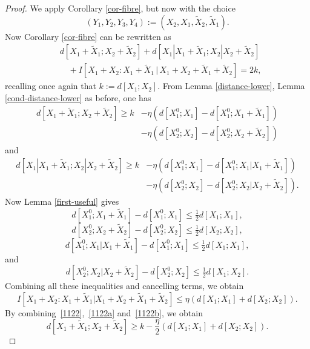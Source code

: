 \begin{proof}
  We apply Corollary \ref{cor-fibre}, but now with the choice
  \[
    (Y_1,Y_2,Y_3,Y_4) := (X_2, X_1, \tilde X_2, \tilde X_1).
  \]
  Now Corollary \ref{cor-fibre} can be rewritten as
  \begin{align*}
    &d[X_1+\tilde X_1;X_2+\tilde X_2] + d[X_1|X_1+\tilde X_1; X_2|X_2+\tilde X_2] \\
    &\quad + I[ X_1+X_2 : X_1 + \tilde X_1 \,|\, X_1+X_2+\tilde X_1+\tilde X_2 ] = 2k,
  \end{align*}
  recalling once again that $k := d[X_1;X_2]$.  From Lemma \ref{distance-lower}, Lemma \ref{cond-distance-lower} as before, one has
  \begin{align}
    \nonumber
    d[X_1+\tilde X_1; X_2+\tilde X_2] \geq k &- \eta(d[X^0_1;X_1] - d[X^0_1;X_1+\tilde X_1]) \\
    &- \eta(d[X^0_2;X_2] - d[X^0_2;X_2+\tilde X_2])
  \label{1122}
  \end{align}
  and
  \begin{align*}
    d[X_1|X_1+\tilde X_1; X_2|X_2+\tilde X_2]   \geq k &- \eta (d[X^0_1;X_1] - d[X^0_1;X_1|X_1+\tilde X_1]) \\& - \eta (d[X^0_2;X_2] - d[X^0_2;X_2|X_2+\tilde X_2]) .
  \end{align*}
  Now Lemma \ref{first-useful} gives
  \begin{equation}\label{1122a} d[X^0_1;X_1+\tilde X_1] - d[X^0_1;X_1] \leq \tfrac{1}{2} d[X_1;X_1],\end{equation}
  \begin{equation}\label{1122b}
    d[X^0_2;X_2+\tilde X_2] - d[X^0_2;X_2] \leq \tfrac{1}{2} d[X_2;X_2],
  \end{equation}
  \[
    d[X^0_1;X_1|X_1+\tilde X_1] -  d[X^0_1;X_1] \leq  \tfrac{1}{2} d[X_1;X_1],
  \]
  and
  \[
    d[X^0_2;X_2|X_2+\tilde X_2] -  d[X^0_2;X_2] \leq \tfrac{1}{2} d[X_1;X_2].
    \]
  Combining all these inequalities and cancelling terms, we obtain
  \begin{equation}\label{combined}
  I[ X_1+X_2 : X_1 + \tilde X_1 | X_1+X_2+\tilde X_1+\tilde X_2 ] \leq \eta ( d[X_1; X_1] + d[X_2; X_2] ).
  \end{equation}
By combining~\eqref{1122},~\eqref{1122a} and~\eqref{1122b}, we obtain
  \begin{equation}\label{d12}
    d[X_1+\tilde X_1; X_2+\tilde X_2] \geq k - \frac{\eta}{2} ( d[X_1; X_1] + d[X_2;X_2] ).
  \end{equation}

\end{proof}
